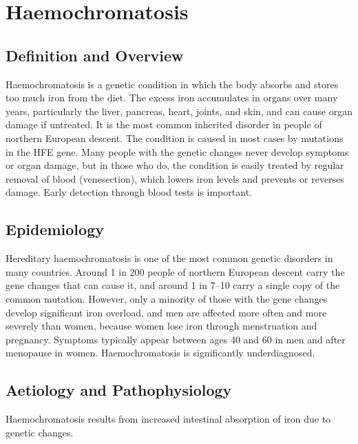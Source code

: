 \chapter{Haemochromatosis}

\section*{Definition and Overview}
Haemochromatosis is a genetic condition in which the body absorbs and stores too much iron from the diet. The excess iron accumulates in organs over many years, particularly the liver, pancreas, heart, joints, and skin, and can cause organ damage if untreated. It is the most common inherited disorder in people of northern European descent. The condition is caused in most cases by mutations in the HFE gene. Many people with the genetic changes never develop symptoms or organ damage, but in those who do, the condition is easily treated by regular removal of blood (venesection), which lowers iron levels and prevents or reverses damage. Early detection through blood tests is important.

\section*{Epidemiology}
Hereditary haemochromatosis is one of the most common genetic disorders in many countries. Around 1 in 200 people of northern European descent carry the gene changes that can cause it, and around 1 in 7--10 carry a single copy of the common mutation. However, only a minority of those with the gene changes develop significant iron overload, and men are affected more often and more severely than women, because women lose iron through menstruation and pregnancy. Symptoms typically appear between ages 40 and 60 in men and after menopause in women. Haemochromatosis is significantly underdiagnosed.

\section*{Aetiology and Pathophysiology}
Haemochromatosis results from increased intestinal absorption of iron due to genetic changes.

